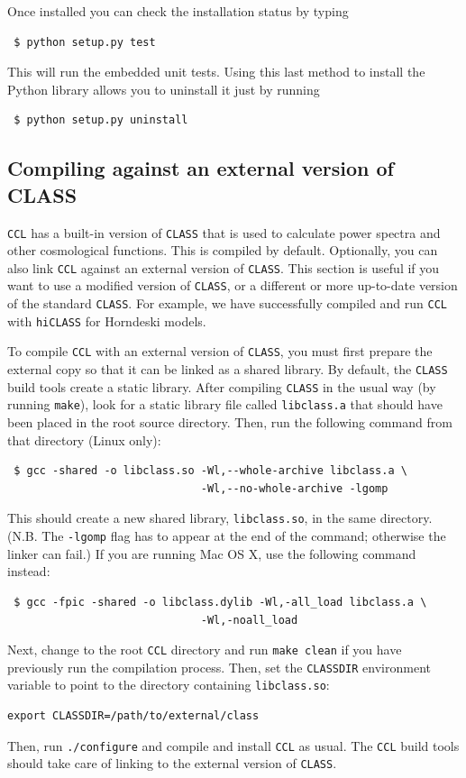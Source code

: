 \documentclass[\docopts]{\docclass}
\begin{document}
Once installed you can check the installation status by typing
\begin{verbatim}
 $ python setup.py test
\end{verbatim}

This will run the embedded unit tests. Using this last method to install the Python library allows you to uninstall it just by running
\begin{verbatim}
 $ python setup.py uninstall
\end{verbatim}
 
\subsection{Compiling against an external version of CLASS}

{\tt CCL} has a built-in version of {\tt CLASS} that is used to calculate power spectra and other cosmological functions. This is compiled by default. Optionally, you can also link {\tt CCL} against an external version of {\tt CLASS}. This section is useful if you want to use a modified version of {\tt CLASS}, or a different or more up-to-date version of the standard {\tt CLASS}. For example, we have successfully compiled and run {\tt CCL} with {\tt hiCLASS} \citep{hiclass} for Horndeski models.

To compile {\tt CCL} with an external version of {\tt CLASS}, you must first prepare the external copy so that it can be linked as a shared library. By default, the {\tt CLASS} build tools create a static library. After compiling {\tt CLASS} in the usual way (by running {\tt make}), look for a static library file called {\tt libclass.a} that should have been placed in the root source directory. Then, run the following command from that directory (Linux only):
\begin{verbatim}
 $ gcc -shared -o libclass.so -Wl,--whole-archive libclass.a \
                              -Wl,--no-whole-archive -lgomp
\end{verbatim}
This should create a new shared library, {\tt libclass.so}, in the same directory. (N.B. The {\tt -lgomp} flag has to appear at the end of the command; otherwise the linker can fail.) If you are running Mac OS X, use the following command instead:
\begin{verbatim}
 $ gcc -fpic -shared -o libclass.dylib -Wl,-all_load libclass.a \
                              -Wl,-noall_load
\end{verbatim}

Next, change to the root {\tt CCL} directory and run {\tt make clean} if you have previously run the compilation process. Then, set the {\tt CLASSDIR} environment variable to point to the directory containing {\tt libclass.so}:
\begin{verbatim}
export CLASSDIR=/path/to/external/class
\end{verbatim}
Then, run {\tt ./configure} and compile and install {\tt CCL} as usual. The {\tt CCL} build tools should take care of linking to the external version of {\tt CLASS}.
\end{document}
